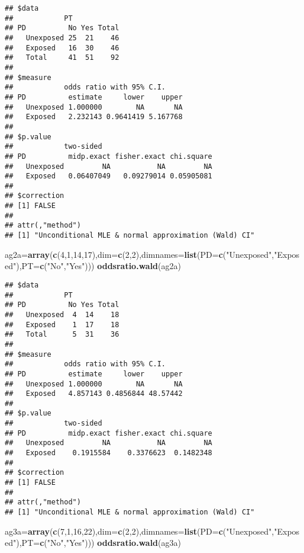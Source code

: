 \documentclass[]{article}
\newenvironment{Shaded}{\begin{snugshade}}{\end{snugshade}}
\newcommand{\KeywordTok}[1]{\textcolor[rgb]{0.13,0.29,0.53}{\textbf{#1}}}
\newcommand{\DataTypeTok}[1]{\textcolor[rgb]{0.13,0.29,0.53}{#1}}
\newcommand{\DecValTok}[1]{\textcolor[rgb]{0.00,0.00,0.81}{#1}}
\newcommand{\StringTok}[1]{\textcolor[rgb]{0.31,0.60,0.02}{#1}}
\newcommand{\NormalTok}[1]{#1}
\begin{document}
\begin{verbatim}
## $data
##            PT
## PD          No Yes Total
##   Unexposed 25  21    46
##   Exposed   16  30    46
##   Total     41  51    92
## 
## $measure
##            odds ratio with 95% C.I.
## PD          estimate     lower    upper
##   Unexposed 1.000000        NA       NA
##   Exposed   2.232143 0.9641419 5.167768
## 
## $p.value
##            two-sided
## PD          midp.exact fisher.exact chi.square
##   Unexposed         NA           NA         NA
##   Exposed   0.06407049   0.09279014 0.05905081
## 
## $correction
## [1] FALSE
## 
## attr(,"method")
## [1] "Unconditional MLE & normal approximation (Wald) CI"
\end{verbatim}

\begin{Shaded}
\begin{Highlighting}[]
\NormalTok{ag2a=}\KeywordTok{array}\NormalTok{(}\KeywordTok{c}\NormalTok{(}\DecValTok{4}\NormalTok{,}\DecValTok{1}\NormalTok{,}\DecValTok{14}\NormalTok{,}\DecValTok{17}\NormalTok{),}\DataTypeTok{dim=}\KeywordTok{c}\NormalTok{(}\DecValTok{2}\NormalTok{,}\DecValTok{2}\NormalTok{),}\DataTypeTok{dimnames=}\KeywordTok{list}\NormalTok{(}\DataTypeTok{PD=}\KeywordTok{c}\NormalTok{(}\StringTok{"Unexposed"}\NormalTok{,}\StringTok{"Exposed"}\NormalTok{),}\DataTypeTok{PT=}\KeywordTok{c}\NormalTok{(}\StringTok{"No"}\NormalTok{,}\StringTok{"Yes"}\NormalTok{)))}
\KeywordTok{oddsratio.wald}\NormalTok{(ag2a)}
\end{Highlighting}
\end{Shaded}

\begin{verbatim}
## $data
##            PT
## PD          No Yes Total
##   Unexposed  4  14    18
##   Exposed    1  17    18
##   Total      5  31    36
## 
## $measure
##            odds ratio with 95% C.I.
## PD          estimate     lower    upper
##   Unexposed 1.000000        NA       NA
##   Exposed   4.857143 0.4856844 48.57442
## 
## $p.value
##            two-sided
## PD          midp.exact fisher.exact chi.square
##   Unexposed         NA           NA         NA
##   Exposed    0.1915584    0.3376623  0.1482348
## 
## $correction
## [1] FALSE
## 
## attr(,"method")
## [1] "Unconditional MLE & normal approximation (Wald) CI"
\end{verbatim}

\begin{Shaded}
\begin{Highlighting}[]
\NormalTok{ag3a=}\KeywordTok{array}\NormalTok{(}\KeywordTok{c}\NormalTok{(}\DecValTok{7}\NormalTok{,}\DecValTok{1}\NormalTok{,}\DecValTok{16}\NormalTok{,}\DecValTok{22}\NormalTok{),}\DataTypeTok{dim=}\KeywordTok{c}\NormalTok{(}\DecValTok{2}\NormalTok{,}\DecValTok{2}\NormalTok{),}\DataTypeTok{dimnames=}\KeywordTok{list}\NormalTok{(}\DataTypeTok{PD=}\KeywordTok{c}\NormalTok{(}\StringTok{"Unexposed"}\NormalTok{,}\StringTok{"Exposed"}\NormalTok{),}\DataTypeTok{PT=}\KeywordTok{c}\NormalTok{(}\StringTok{"No"}\NormalTok{,}\StringTok{"Yes"}\NormalTok{)))}
\KeywordTok{oddsratio.wald}\NormalTok{(ag3a)}
\end{Highlighting}
\end{Shaded}
\end{document}
